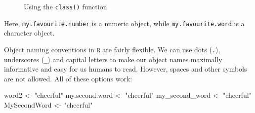 \documentclass[
  letterpaper,
  DIV=11,
  numbers=noendperiod,
  oneside]{scrreprt}
\newenvironment{Shaded}{\begin{snugshade}}{\end{snugshade}}
\newcommand{\NormalTok}[1]{\textcolor[rgb]{0.00,0.23,0.31}{#1}}
\newcommand{\OtherTok}[1]{\textcolor[rgb]{0.00,0.23,0.31}{#1}}
\newcommand{\StringTok}[1]{\textcolor[rgb]{0.13,0.47,0.30}{#1}}
\begin{document}
\begin{figure}


\caption{\label{fig-ShowObjectClass}Using the \texttt{class()} function}

\end{figure}%

Here, \texttt{my.favourite.number} is a numeric object, while
\texttt{my.favourite.word} is a character object.

Object naming conventions in \texttt{R} are fairly flexible. We can use
dots (\texttt{.}), underscores (\texttt{\_}) and capital letters to make
our object names maximally informative and easy for us humans to read.
However, spaces and other symbols are not allowed. All of these options
work:

\begin{Shaded}
\begin{Highlighting}[]
\NormalTok{word2 }\OtherTok{\textless{}{-}} \StringTok{"cheerful"}
\NormalTok{my.second.word }\OtherTok{\textless{}{-}} \StringTok{"cheerful"}
\NormalTok{my\_second\_word }\OtherTok{\textless{}{-}} \StringTok{"cheerful"}
\NormalTok{MySecondWord }\OtherTok{\textless{}{-}} \StringTok{"cheerful"}
\end{Highlighting}
\end{Shaded}
\end{document}

